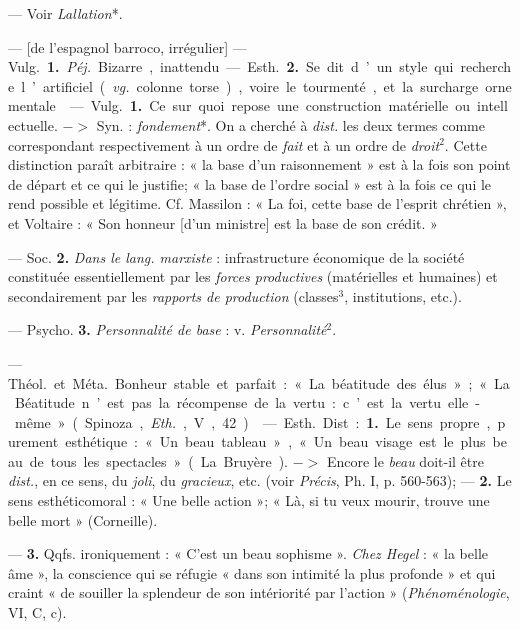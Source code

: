 
	\begin{itemize}[leftmargin=1cm, label=, itemsep=1pt]

 — Voir {\it Lallation}*.

 — [de l'espagnol {\it }barroco, irrégulier] — \si{Vulg.} {\bf 1.} {\it Péj.} Bizarre,
inattendu. — \si{Esth.} {\bf 2.} Se dit d’un
style qui recherche l’artificiel ({\it vg.}
colonne torse), voire le tourmenté,
et la surcharge ornementale.

 — \si{Vulg.} {\bf 1.} Ce sur quoi repose
une construction matérielle ou intellectuelle. $->$ Syn. : {\it fondement}*. On
a cherché à {\it dist.} les deux termes
comme correspondant respectivement à un ordre de {\it fait} et à un ordre
de {\it droit}$^2$. Cette distinction paraît
arbitraire : « la base d’un raisonnement » est à la fois son point de
départ et ce qui le justifie; « la base
de l’ordre social » est à la fois ce qui
le rend possible et légitime. Cf. Massilon : « La foi, cette base de l'esprit
chrétien », et Voltaire : « Son honneur [d'un ministre] est la base de
son crédit. »

— Soc. {\bf 2.} {\it Dans le lang. marxiste} :
infrastructure économique de la
société constituée essentiellement
par les {\it forces productives} (matérielles
et humaines) et secondairement par
les {\it rapports de production} (classes$^3$,
institutions, etc.).

— Psycho. {\bf 3.} {\it Personnalité de base} :
v. {\it Personnalité}$^2$.

 — \si{Théol.} et \si{Méta.} Bonheur
stable et parfait : « La béatitude des
élus »; « La Béatitude n’est pas la
récompense de la vertu : c’est la vertu elle-même » (Spinoza, {\it Eth.}, V, 42).

 — \si{Esth.} Dist. : {\bf 1.} Le sens propre,
purement esthétique : « Un beau
tableau », « Un beau visage est le
plus beau de tous les spectacles » (La
Bruyère). $->$ Encore le {\it beau} doit-il
être {\it dist.}, en ce sens, du {\it joli}, du
{\it gracieux}, etc. (voir {\it Précis}, Ph. I,
p. 560-563); — {\bf 2.} Le sens esthéticomoral : « Une belle action »; « Là, si
tu veux mourir, trouve une belle
mort » (Corneille).
 
— {\bf 3.} Qqfs. ironiquement : « C’est
un beau sophisme ». {\it Chez Hegel} :
« la belle âme », la conscience qui se
réfugie « dans son intimité la plus
profonde » et qui craint « de souiller
la splendeur de son intériorité par
l’action » ({\it Phénoménologie}, VI, C, c).


\end{itemize}
